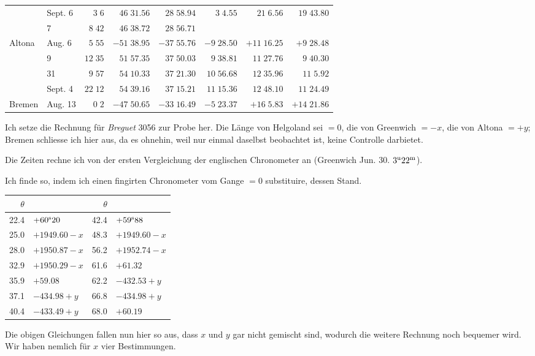 \begin{center}
\begin{tabular}{ll|r|r|r|r|r|r}
 & Sept. 6 & $3\;6$ & $46\;31.56$ & $28\;58.94$ & $3\;4.55$ & $21\;6.56$ & $19\;43.80$ \\
 & 7 & $8\;42$ & $46\;38.72$ & $28\;56.71$ &  &  &  \\
Altona & Aug. 6 & $5\;55$ & $-51\;38.95$ & $-37\;55.76$ & $-9\;28.50$ & $+11\;16.25$ & $+9\;28.48$ \\
 & 9 & $12\;35$ & $51\;57.35$ & $37\;50.03$ & $9\;38.81$ & $11\;27.76$ & $9\;40.30$ \\
 & 31 & $9\;57$ & $54\;10.33$ & $37\;21.30$ & $10\;56.68$ & $12\;35.96$ & $11\;5.92$ \\
 & Sept. 4 & $22\;12$ & $54\;39.16$ & $37\;15.21$ & $11\;15.36$ & $12\;48.10$ & $11\;24.49$ \\
Bremen & Aug. 13 & $0\;2$ & $-47\;50.65$ & $-33\;16.49$ & $-5\;23.37$ & $+16\;5.83$ & $+14\;21.86$ \\
\end{tabular}
\endgroup
\end{center}

Ich setze die Rechnung für \emph{Breguet} 3056 zur Probe her. Die Länge von Helgoland sei $=0$, die
von Greenwich $=-x$, die von Altona $=+y$; Bremen schliesse ich hier aus, da es ohnehin, weil nur
einmal daselbst beobachtet ist, keine Controlle darbietet.

Die Zeiten rechne ich von der ersten Vergleichung der englischen Chronometer an (Greenwich
Jun. 30. $3^{\rm u}22^{\rm m}$).

Ich finde so, indem ich einen fingirten Chronometer vom Gange $=0$ substituire, dessen Stand.

\begin{center}
\begin{tabular}{r|l||r|l}
$\theta$ & & $\theta$ & \\
\hline
22.4 & $+60^{\rm s}20$ & 42.4 & $+59^{\rm s}88$ \\
25.0 & $+1949.60-x$ & 48.3 & $+1949.60-x$ \\
28.0 & $+1950.87-x$ & 56.2 & $+1952.74-x$ \\
32.9 & $+1950.29-x$ & 61.6 & $+61.32$ \\
35.9 & $+59.08$ & 62.2 & $-432.53+y$ \\
37.1 & $-434.98+y$ & 66.8 & $-434.98+y$ \\
40.4 & $-433.49+y$ & 68.0 & $+60.19$ \\
\end{tabular}
\end{center}

Die obigen Gleichungen fallen nun hier so aus, dass $x$ und $y$ gar nicht gemischt sind, wodurch
die weitere Rechnung noch bequemer wird. Wir haben nemlich für $x$ vier Bestimmungen.

